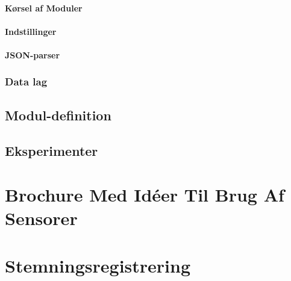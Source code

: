 \subsubsection{Kørsel af Moduler}

\subsubsection{Indstillinger}

\subsubsection{JSON-parser}\label{subsub:JSONparser}


\subsection{Data lag}


\section{Modul-definition}\label{modul_definition}


\section{Eksperimenter}




\label{bib:mybiblio}

\appendix



\chapter{Brochure Med Idéer Til Brug Af Sensorer}\label{app:brochure}
 

\chapter{Stemningsregistrering}


